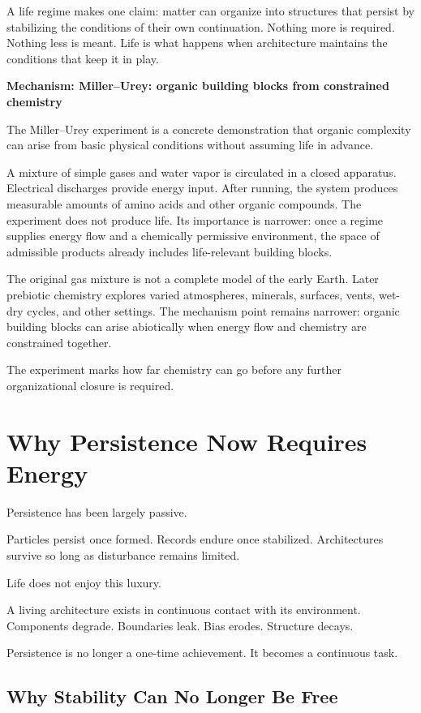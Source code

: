 \documentclass[11pt,twoside,openright]{book}
\newenvironment{mechanismboxpage}[1]
  {\par\medskip
   \noindent
   \begin{minipage}{\linewidth}
   \begin{framed}
   \noindent\textbf{Mechanism: #1}\par\medskip}
  {\end{framed}
   \end{minipage}
   \par\medskip}
\begin{document}
A life regime makes one claim: matter can organize into structures that persist by stabilizing the conditions of their own continuation. Nothing more is required. Nothing less is meant. Life is what happens when architecture maintains the conditions that keep it in play.

\begin{mechanismboxpage}{Miller--Urey: organic building blocks from constrained chemistry}
The Miller--Urey experiment is a concrete demonstration that organic complexity can arise from basic physical conditions without assuming life in advance.

A mixture of simple gases and water vapor is circulated in a closed apparatus. Electrical discharges provide energy input. After running, the system produces measurable amounts of amino acids and other organic compounds. The experiment does not produce life. Its importance is narrower: once a regime supplies energy flow and a chemically permissive environment, the space of admissible products already includes life-relevant building blocks.

The original gas mixture is not a complete model of the early Earth. Later prebiotic chemistry explores varied atmospheres, minerals, surfaces, vents, wet-dry cycles, and other settings. The mechanism point remains narrower: organic building blocks can arise abiotically when energy flow and chemistry are constrained together.

The experiment marks how far chemistry can go before any further organizational closure is required.
\end{mechanismboxpage}

\chapter{Why Persistence Now Requires Energy}
\label{ch:energy_persistence}

Persistence has been largely passive.

Particles persist once formed. Records endure once stabilized. Architectures survive so long as disturbance remains limited.

Life does not enjoy this luxury.

A living architecture exists in continuous contact with its environment. Components degrade. Boundaries leak. Bias erodes. Structure decays.

Persistence is no longer a one-time achievement. It becomes a continuous task.

\section*{Why Stability Can No Longer Be Free}
\end{document}

